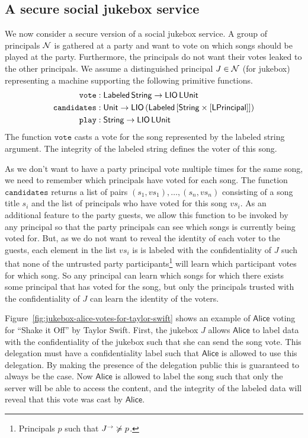 \subsection{A secure social jukebox service}\label{subsec:jukebox}
We now consider a secure version of a social jukebox service. A group of principals $\mathcal{N}$ is gathered at a party and want to vote on which songs should be played at the party. Furthermore, the principals do not want their votes leaked to the other principals. We assume a distinguished principal $J \in \mathcal{N}$ (for jukebox) representing a machine supporting the following primitive functions.
\begin{align*}
\mathtt{vote}&: \mathsf{Labeled}\,\mathsf{String} \to \mathsf{LIO}\,\mathsf{LUnit}\\
\mathtt{candidates}&: \mathsf{Unit} \to \mathsf{LIO}\,(\mathsf{Labeled}\,\lbrack\mathsf{String} \times \lbrack\mathsf{LPrincipal}\rbrack\rbrack)\\
\mathtt{play}&: \mathsf{String} \to \mathsf{LIO}\,\mathsf{LUnit}
\end{align*}
The function $\mathtt{vote}$ casts a vote for the song represented by the labeled string argument. The integrity of the labeled string defines the voter of this song.

As we don't want to have a party principal vote multiple times for the same song, we need to remember which principals have voted for each song. The function $\mathtt{candidates}$ returns a list of pairs $(s_1, \mathit{vs}_1), \dots, (s_n, {\mathit{vs}}_n)$ consisting of a song title $s_i$ and the list of principals who have voted for this song $\mathit{vs}_i$. As an additional feature to the party guests, we allow this function to be invoked by any principal so that the party principals can see which songs is currently being voted for. But, as we do not want to reveal the identity of each voter to the guests, each element in the list $\mathit{vs}_i$ is is labeled with the confidentiality of $J$ such that none of the untrusted party participants\footnote{Principals $p$ such that $J^{\rightarrow} \not\succcurlyeq p$.} will learn which participant votes for which song. So any principal can learn which songs for which there exists some principal that has voted for the song, but only the principals trusted with the confidentiality of $J$ can learn the identity of the voters.

Figure~\ref{fig:jukebox-alice-votes-for-taylor-swift} shows an example of $\mathsf{Alice}$ voting for ``Shake it Off'' by Taylor Swift. First, the jukebox $J$ allows $\mathsf{Alice}$ to label data with the confidentiality of the jukebox such that she can send the song vote. This delegation must have a confidentiality label such that $\mathsf{Alice}$ is allowed to use this delegation. By making the presence of the delegation public this is guaranteed to always be the case. Now $\mathsf{Alice}$ is allowed to label the song such that only the server will be able to access the content, and the integrity of the labeled data will reveal that this vote was cast by $\mathsf{Alice}$.

